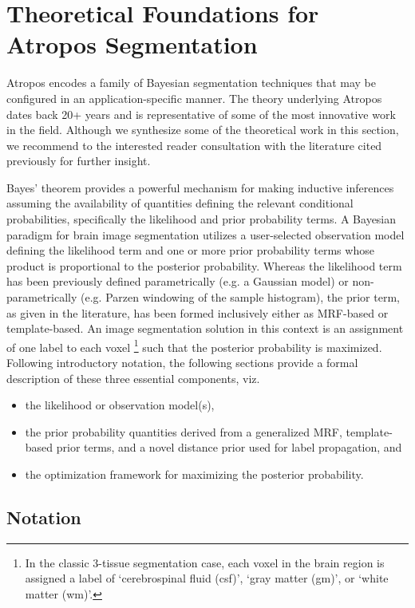 \documentclass[11pt,english]{article}
\begin{document}
\section{Theoretical Foundations for Atropos Segmentation} 

Atropos encodes a family of Bayesian segmentation techniques that may be configured in an application-specific manner.  The theory underlying Atropos dates back 20+ years and is representative of some of the most innovative work in the field.  Although we synthesize some of the theoretical work in this section, we recommend to the interested reader consultation with the literature cited previously for further insight.

Bayes' theorem provides a powerful mechanism for making inductive inferences assuming the availability of quantities defining the relevant conditional probabilities, specifically the likelihood and prior probability terms.  A Bayesian paradigm for brain image segmentation utilizes a user-selected observation model defining the likelihood term and one or more prior probability terms whose product is proportional to the posterior probability.  Whereas the likelihood term has been previously defined parametrically (e.g. a Gaussian model) or non-parametrically (e.g. Parzen windowing of the sample histogram), the prior term, as given in the literature, has been formed inclusively either as MRF-based or template-based.  An image segmentation solution in this context is an assignment of one label to each voxel%
\footnote{
In the classic 3-tissue segmentation case, each voxel in the brain region is assigned a label of `cerebrospinal fluid (csf)', `gray matter (gm)', or `white matter (wm)'. 
}
such that the posterior probability is maximized.  Following introductory notation, the following sections provide a formal description of these three essential components, viz.
\begin{itemize}
  \item the likelihood or observation model(s),
  \item the prior probability quantities derived from a generalized MRF, template-based prior terms, and a novel distance prior used for label propagation, and 
  \item the optimization framework for maximizing the posterior probability.
\end{itemize}

\subsection{Notation}
\end{document}
